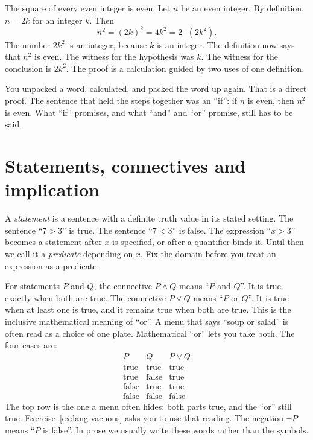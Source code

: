 \begin{examplex}
The square of every even integer is even. Let $n$ be an even integer. By definition, $n=2k$ for an integer $k$. Then
\[
n^2=(2k)^2=4k^2=2\cdot(2k^2).
\]
The number $2k^2$ is an integer, because $k$ is an integer. The definition now says that $n^2$ is even. The witness for the hypothesis was $k$. The witness for the conclusion is $2k^2$. The proof is a calculation guided by two uses of one definition.
\end{examplex}

You unpacked a word, calculated, and packed the word up again. That is a direct proof. The sentence that held the steps together was an ``if'': if $n$ is even, then $n^2$ is even. What ``if'' promises, and what ``and'' and ``or'' promise, still has to be said.

\section{Statements, connectives and implication}

A \emph{statement} is a sentence with a definite truth value in its stated setting. The sentence ``$7>3$'' is true. The sentence ``$7<3$'' is false. The expression ``$x>3$'' becomes a statement after $x$ is specified, or after a quantifier binds it. Until then we call it a \emph{predicate} depending on $x$. Fix the domain before you treat an expression as a predicate.

For statements $P$ and $Q$, the connective $P\land Q$ means ``$P$ and $Q$''. It is true exactly when both are true. The connective $P\lor Q$ means ``$P$ or $Q$''. It is true when at least one is true, and it remains true when both are true. This is the inclusive mathematical meaning of ``or''. A menu that says ``soup or salad'' is often read as a choice of one plate. Mathematical ``or'' lets you take both. The four cases are:
\[
\begin{array}{c|c|c}
P&Q&P\lor Q\\\hline
\text{true}&\text{true}&\text{true}\\
\text{true}&\text{false}&\text{true}\\
\text{false}&\text{true}&\text{true}\\
\text{false}&\text{false}&\text{false}
\end{array}
\]
The top row is the one a menu often hides: both parts true, and the ``or'' still true. Exercise~\ref{ex:lang-vacuous} asks you to use that reading. The negation $\neg P$ means ``$P$ is false''. In prose we usually write these words rather than the symbols.

